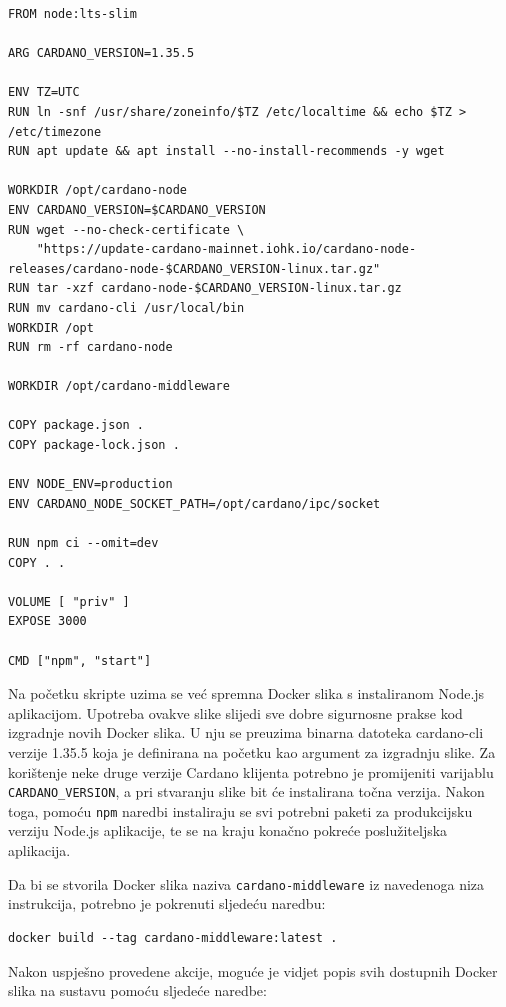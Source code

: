 \documentclass[times, utf8, diplomski]{fer}
\begin{document}
\begin{lstlisting}
FROM node:lts-slim

ARG CARDANO_VERSION=1.35.5

ENV TZ=UTC
RUN ln -snf /usr/share/zoneinfo/$TZ /etc/localtime && echo $TZ > /etc/timezone
RUN apt update && apt install --no-install-recommends -y wget

WORKDIR /opt/cardano-node
ENV CARDANO_VERSION=$CARDANO_VERSION
RUN wget --no-check-certificate \
    "https://update-cardano-mainnet.iohk.io/cardano-node-releases/cardano-node-$CARDANO_VERSION-linux.tar.gz"
RUN tar -xzf cardano-node-$CARDANO_VERSION-linux.tar.gz
RUN mv cardano-cli /usr/local/bin
WORKDIR /opt
RUN rm -rf cardano-node

WORKDIR /opt/cardano-middleware

COPY package.json .
COPY package-lock.json .

ENV NODE_ENV=production
ENV CARDANO_NODE_SOCKET_PATH=/opt/cardano/ipc/socket

RUN npm ci --omit=dev
COPY . .

VOLUME [ "priv" ]
EXPOSE 3000

CMD ["npm", "start"]
\end{lstlisting}

Na početku skripte uzima se već spremna Docker slika s instaliranom Node.js aplikacijom. Upotreba ovakve slike slijedi sve dobre sigurnosne prakse kod izgradnje novih Docker slika. U nju se preuzima binarna datoteka cardano-cli verzije 1.35.5 koja je definirana na početku kao argument za izgradnju slike. Za korištenje neke druge verzije Cardano klijenta potrebno je promijeniti varijablu \texttt{CARDANO\_VERSION}, a pri stvaranju slike bit će instalirana točna verzija. Nakon toga, pomoću \texttt{npm} naredbi instaliraju se svi potrebni paketi za produkcijsku verziju Node.js aplikacije, te se na kraju konačno pokreće poslužiteljska aplikacija.

Da bi se stvorila Docker slika naziva \texttt{cardano-middleware} iz navedenoga niza instrukcija, potrebno je pokrenuti sljedeću naredbu:

\begin{verbatim}
docker build --tag cardano-middleware:latest .
\end{verbatim}

Nakon uspješno provedene akcije, moguće je vidjet popis svih dostupnih Docker slika na sustavu pomoću sljedeće naredbe:
\end{document}
